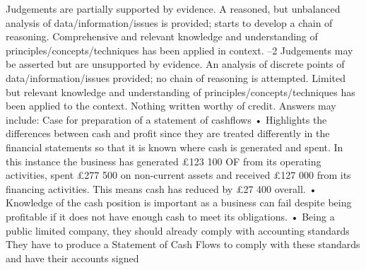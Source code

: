 \documentclass{article}
\begin{document}
Judgements are partially supported by evidence.  A reasoned, but unbalanced \newline
analysis of data/information/issues is provided; starts to develop a chain of \newline
reasoning.  Comprehensive and relevant knowledge and understanding of \newline
principles/concepts/techniques has been applied in context.  –2 \newline
Judgements may be asserted but are unsupported by evidence.  An analysis of \newline
discrete points of data/information/issues provided; no chain of reasoning is \newline
attempted.  Limited but relevant knowledge and understanding of \newline
principles/concepts/techniques has been applied to the context.    \newline
Nothing written worthy of credit.  \newline
 \newline
Answers may include: \newline
 \newline
Case for preparation of a statement of cashflows \newline
 \newline
• Highlights the differences between cash and profit since they are treated differently in the financial \newline
statements so that it is known where cash is generated and spent.  In this instance the business has \newline
generated £123 100 OF from its operating activities, spent £277 500 on non-current assets and \newline
received £127 000 from its financing activities.  This means cash has reduced by £27 400 overall. \newline
• Knowledge of the cash position is important as a business can fail despite being profitable if it does \newline
not have enough cash to meet its obligations. \newline
• Being a public limited company, they should already comply with accounting standards They have to \newline
produce a Statement of Cash Flows to comply with these standards and have their accounts signed \newline
\end{document}
